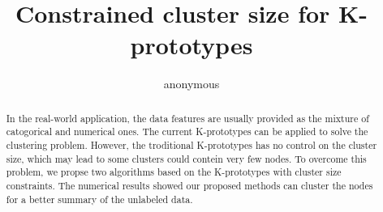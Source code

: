 \documentclass{IEEEtran}
\begin{document}
\title{Constrained cluster size for K-prototypes}

\author{anonymous
}

\maketitle


\begin{abstract}
In the real-world application, the data features are usually provided as the mixture of catogorical and numerical ones. The current
K-prototypes can be applied to solve the clustering problem. However, the troditional K-prototypes has no control on the cluster size,
which may lead to some clusters could contein very few nodes. To overcome this problem, we propse two algorithms based on the K-prototypes
with cluster size constraints. The numerical results showed our proposed methods can cluster the nodes for a better summary of the unlabeled
data.
\end{abstract}






\end{document}
